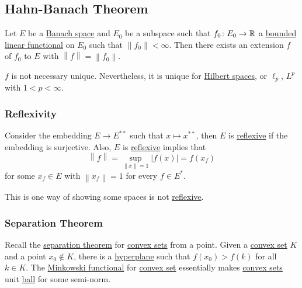 \subsection{Hahn-Banach Theorem}
Let \(E\) be a \hyperref[def:Banach-space]{Banach space} and \(E_0\) be a subspace such that \(f_0 \colon E_0 \to \mathbb{\MakeUppercase{r}} \) a \hyperref[def:bounded-linear-functional]{bounded linear functional} on \(E_0\) such that \(\left\lVert f_0\right\rVert < \infty \). Then there exists an extension \(f\) of \(f_0\) to \(E\) with \(\left\lVert f\right\rVert = \left\lVert f_0\right\rVert \).

\begin{remark}
	\(f\) is not necessary unique. Nevertheless, it is unique for \hyperref[def:Hilbert-space]{Hilbert spaces}, or \(\ell _p\), \(L^p\) with \(1 < p < \infty \).
\end{remark}

\subsubsection{Reflexivity}
Consider the embedding \(E\to E^{\ast\ast} \) such that \(x\mapsto x^{\ast\ast}\), then \(E\) is \hyperref[def:reflexive-space]{reflexive} if the embedding is surjective. Also, \(E\) is \hyperref[def:reflexive-space]{reflexive} implies that
\[
	\left\lVert f\right\rVert = \sup _{\left\lVert x\right\rVert = 1}\left\vert f(x) \right\vert = f(x_f)
\]
for some \(x_f\in E\) with \(\left\lVert x_f\right\rVert = 1\) for every \(f\in E^{\ast} \).

\begin{remark}
	This is one way of showing some spaces is not \hyperref[def:reflexive-space]{reflexive}.
\end{remark}

\subsubsection{Separation Theorem}
Recall the \hyperref[thm:separation-of-a-point-from-a-convex-set]{separation theorem} for \hyperref[def:convex-set]{convex sets} from a point. Given a \hyperref[def:convex-set]{convex set} \(K\) and a point \(x_0 \notin K\), there is a \hyperref[def:hyperplane]{hyperplane} such that \(f(x_0) > f(k)\) for all \(k\in K\). The \hyperref[def:Minkowski-functional]{Minkowski functional} for \hyperref[def:convex-set]{convex set} essentially makes \hyperref[def:convex-set]{convex sets} unit \hyperref[def:ball]{ball} for some semi-norm.